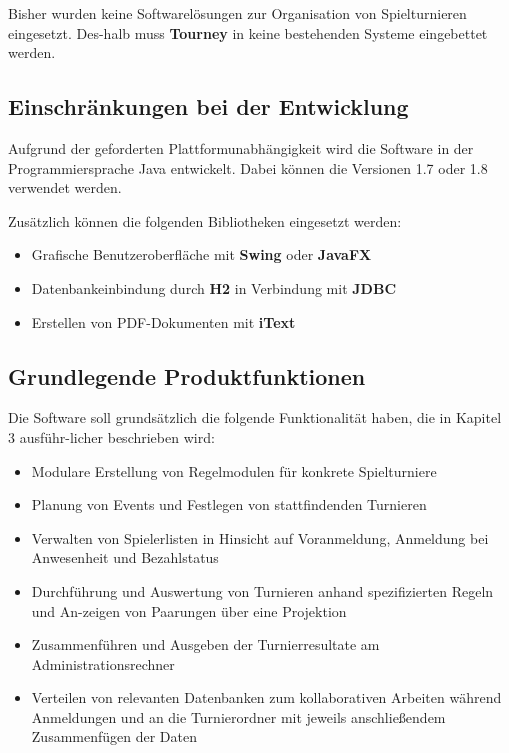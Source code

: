 \documentclass[11pt]{article}
\begin{document}
Bisher wurden keine Softwarelösungen zur Organisation von Spielturnieren eingesetzt. Des-halb muss \textbf{Tourney} in keine bestehenden Systeme eingebettet werden.

\subsection{Einschränkungen bei der Entwicklung}

Aufgrund der geforderten Plattformunabhängigkeit wird die Software in der Programmiersprache Java entwickelt. Dabei können die Versionen 1.7 oder 1.8 verwendet werden.

Zusätzlich können die folgenden Bibliotheken eingesetzt werden:
\begin{itemize}
	\item Grafische Benutzeroberfläche mit \textbf{Swing} oder \textbf{JavaFX}
	\item Datenbankeinbindung durch \textbf{H2} in Verbindung mit \textbf{JDBC}
	\item Erstellen von PDF-Dokumenten mit \textbf{iText}
\end{itemize}

\subsection{Grundlegende Produktfunktionen}

Die Software soll grundsätzlich die folgende Funktionalität haben, die in Kapitel 3 ausführ-licher beschrieben wird:
\begin{itemize}
	\item Modulare Erstellung von Regelmodulen für konkrete Spielturniere
	\item Planung von Events und Festlegen von stattfindenden Turnieren
	\item Verwalten von Spielerlisten in Hinsicht auf Voranmeldung, Anmeldung bei Anwesenheit und Bezahlstatus
	\item Durchführung und Auswertung von Turnieren anhand spezifizierten Regeln und An-zeigen von Paarungen über eine Projektion
	\item Zusammenführen und Ausgeben der Turnierresultate am Administrationsrechner
	\item Verteilen von relevanten Datenbanken zum kollaborativen Arbeiten während Anmeldungen und an die Turnierordner mit jeweils anschließendem Zusammenfügen der Daten
\end{itemize}

\newpage
\end{document}
